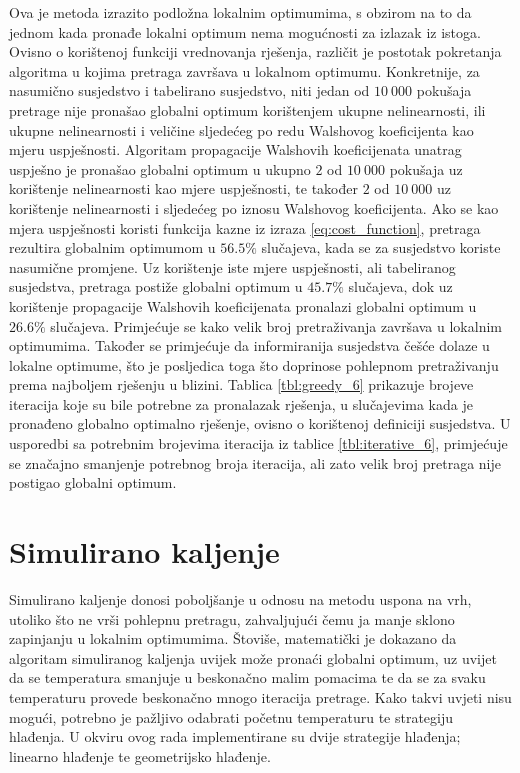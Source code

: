 Ova je metoda izrazito podložna lokalnim optimumima, s obzirom na to da jednom kada pronađe lokalni optimum nema mogućnosti za izlazak iz istoga.
Ovisno o korištenoj funkciji vrednovanja rješenja, različit je postotak pokretanja algoritma u kojima pretraga završava u lokalnom optimumu.
Konkretnije, za nasumično susjedstvo i tabelirano susjedstvo, niti jedan od $10\:000$ pokušaja pretrage nije pronašao globalni optimum korištenjem ukupne nelinearnosti, ili ukupne nelinearnosti i veličine sljedećeg po redu Walshovog koeficijenta kao mjeru uspješnosti.
Algoritam propagacije Walshovih koeficijenata unatrag uspješno je pronašao globalni optimum u ukupno $2$ od $10\:000$ pokušaja uz korištenje nelinearnosti kao mjere uspješnosti, te također $2$ od $10\:000$ uz korištenje nelinearnosti i sljedećeg po iznosu Walshovog koeficijenta.
Ako se kao mjera uspješnosti koristi funkcija kazne iz izraza \eqref{eq:cost_function}, pretraga rezultira globalnim optimumom u $56.5\%$ slučajeva, kada se za susjedstvo koriste nasumične promjene.
Uz korištenje iste mjere uspješnosti, ali tabeliranog susjedstva, pretraga postiže globalni optimum u $45.7\%$ slučajeva, dok uz korištenje propagacije Walshovih koeficijenata pronalazi globalni optimum u $26.6\%$ slučajeva.
Primjećuje se kako velik broj pretraživanja završava u lokalnim optimumima.
Također se primjećuje da informiranija susjedstva češće dolaze u lokalne optimume, što je posljedica toga što doprinose pohlepnom pretraživanju prema najboljem rješenju u blizini.
Tablica \ref{tbl:greedy_6} prikazuje brojeve iteracija koje su bile potrebne za pronalazak rješenja, u slučajevima kada je pronađeno globalno optimalno rješenje, ovisno o korištenoj definiciji susjedstva.
U usporedbi sa potrebnim brojevima iteracija iz tablice \ref{tbl:iterative_6}, primjećuje se značajno smanjenje potrebnog broja iteracija, ali zato velik broj pretraga nije postigao globalni optimum.

\section{Simulirano kaljenje}
Simulirano kaljenje donosi poboljšanje u odnosu na metodu uspona na vrh, utoliko što ne vrši pohlepnu pretragu, zahvaljujući čemu ja manje sklono zapinjanju u lokalnim optimumima.
Štoviše, matematički je dokazano da algoritam simuliranog kaljenja uvijek može pronaći globalni optimum, uz uvijet da se temperatura smanjuje u beskonačno malim pomacima te da se za svaku temperaturu provede beskonačno mnogo iteracija pretrage.
Kako takvi uvjeti nisu mogući, potrebno je pažljivo odabrati početnu temperaturu te strategiju hlađenja.
U okviru ovog rada implementirane su dvije strategije hlađenja; linearno hlađenje te geometrijsko hlađenje.

